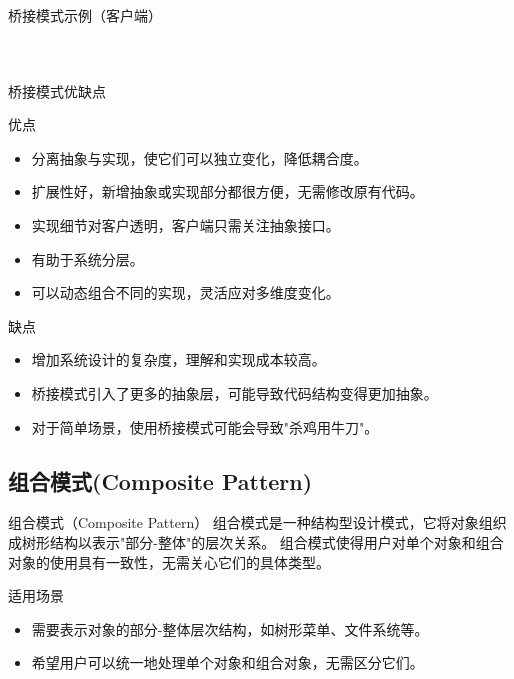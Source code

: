 \documentclass[UTF8,aspectratio=169]{beamer}
\begin{document}
\begin{frame}{桥接模式示例（客户端）}
    \begin{columns}
        \begin{column}{0.48\textwidth}
            \inputminted[firstline=79, lastline=92]{cpp}{code/bridge_pattern.cpp}
        \end{column}
        \begin{column}{0.48\textwidth}
            \inputminted[firstline=94, lastline=104]{cpp}{code/bridge_pattern.cpp}
        \end{column}
    \end{columns}
\end{frame}

\begin{frame}{桥接模式优缺点}
    \begin{ytublock}{优点}
        \begin{itemize}
            \item 分离抽象与实现，使它们可以独立变化，降低耦合度。
            \item 扩展性好，新增抽象或实现部分都很方便，无需修改原有代码。
            \item 实现细节对客户透明，客户端只需关注抽象接口。
            \item 有助于系统分层。
            \item 可以动态组合不同的实现，灵活应对多维度变化。
        \end{itemize}
    \end{ytublock}
    \begin{alertytublock}{缺点}
        \begin{itemize}
            \item 增加系统设计的复杂度，理解和实现成本较高。
            \item 桥接模式引入了更多的抽象层，可能导致代码结构变得更加抽象。
            \item 对于简单场景，使用桥接模式可能会导致"杀鸡用牛刀"。
        \end{itemize}
    \end{alertytublock}
\end{frame}

\subsection{组合模式(Composite Pattern)}

\begin{frame}{组合模式（Composite Pattern）}
    组合模式是一种结构型设计模式，它将对象组织成树形结构以表示"部分-整体"的层次关系。
    组合模式使得用户对单个对象和组合对象的使用具有一致性，无需关心它们的具体类型。
    \begin{ytublock}{适用场景}
        \begin{itemize}
            \item 需要表示对象的部分-整体层次结构，如树形菜单、文件系统等。
            \item 希望用户可以统一地处理单个对象和组合对象，无需区分它们。
        \end{itemize}
    \end{ytublock}
\end{frame}
\end{document}
